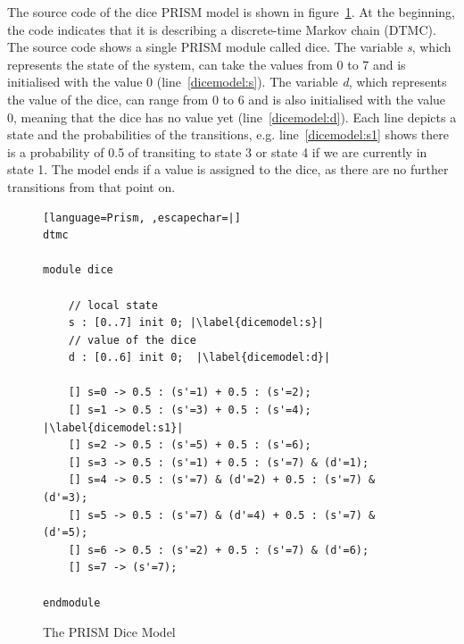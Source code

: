 \documentclass[
a4paper,
12pt
]{scrartcl}
\begin{document}
The source code of the dice PRISM model is shown in figure~\ref{fig:dicemodel}. At the beginning, the code indicates that it is describing a discrete-time Markov chain (DTMC). The source code shows a single PRISM module called dice. The variable \textit{s}, which represents the state of the system, can take the values from 0 to 7 and is initialised with the value 0 (line~\ref{dicemodel:s}). The variable \textit{d}, which represents the value of the dice, can range from 0 to 6 and is also initialised with the value 0, meaning that the dice has no value yet (line~\ref{dicemodel:d}).
Each line depicts a state and the probabilities of the transitions, e.g. line~\ref{dicemodel:s1} shows there is a probability of 0.5 of transiting to state 3 or state 4 if we are currently in state 1. The model ends if a value is assigned to the dice, as there are no further transitions from that point on.

\begin{figure}[ht!]
\begin{lstlisting}[language=Prism, ,escapechar=|]
dtmc

module dice

	// local state
	s : [0..7] init 0; |\label{dicemodel:s}|
	// value of the dice
	d : [0..6] init 0;  |\label{dicemodel:d}|
	
	[] s=0 -> 0.5 : (s'=1) + 0.5 : (s'=2);
	[] s=1 -> 0.5 : (s'=3) + 0.5 : (s'=4); |\label{dicemodel:s1}|
	[] s=2 -> 0.5 : (s'=5) + 0.5 : (s'=6);
	[] s=3 -> 0.5 : (s'=1) + 0.5 : (s'=7) & (d'=1);
	[] s=4 -> 0.5 : (s'=7) & (d'=2) + 0.5 : (s'=7) & (d'=3);
	[] s=5 -> 0.5 : (s'=7) & (d'=4) + 0.5 : (s'=7) & (d'=5);
	[] s=6 -> 0.5 : (s'=2) + 0.5 : (s'=7) & (d'=6);
	[] s=7 -> (s'=7);
	
endmodule

\end{lstlisting}
\caption{The PRISM Dice Model}
\label{fig:dicemodel}
\end{figure}
\end{document}

